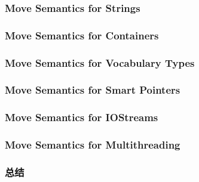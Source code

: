 \documentclass[11pt,a4paper,UTF8]{ctexart}
\begin{document}
		\subsubsection{Move Semantics for Strings}
		\subsubsection{Move Semantics for Containers}
		\subsubsection{Move Semantics for Vocabulary Types}
		\subsubsection{Move Semantics for Smart Pointers}
		\subsubsection{Move Semantics for IOStreams}
		\subsubsection{Move Semantics for Multithreading}
		\subsubsection{总结}
\end{document}
